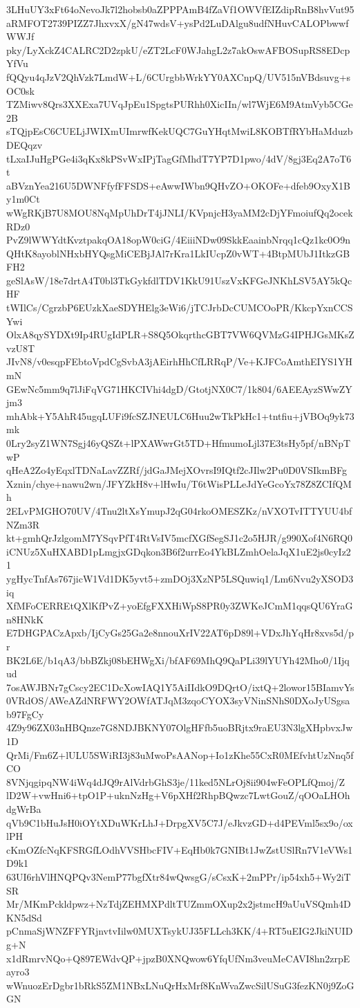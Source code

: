 3LHuUY3xFt64oNevoJk7l2hobsb0aZPPPAmB4fZaVf1OWVfEIZdipRnB8hvVut95
aRMFOT2739PIZZ7JhxvxX/gN47wdsV+ysPd2LuDAlgu8udfNHuvCALOPbwwfWWJf
pky/LyXckZ4CALRC2D2zpkU/eZT2LcF0WJahgL2z7akOswAFBOSupRS8EDcpYfVu
fQQyu4qJzV2QhVzk7LmdW+L/6CUrgbbWrkYY0AXCnpQ/UV515nVBdsuvg+sOC0sk
TZMiwv8Qrs3XXExa7UVqJpEu1SpgtsPURhh0XicIIn/wl7WjE6M9AtmVyb5CGe2B
sTQjpEsC6CUELjJWIXmUImrwfKekUQC7GuYHqtMwiL8KOBTfRYbHaMduzbDEQqzv
tLxaIJuHgPGe4i3qKx8kPSvWxIPjTagGfMhdT7YP7D1pwo/4dV/8gj3Eq2A7oT6t
aBVznYea216U5DWNFfyfFFSDS+eAwwIWbn9QHvZO+OKOFe+dfeb9OxyX1By1m0Ct
wWgRKjB7U8MOU8NqMpUhDrT4jJNLI/KVpnjcH3yaMM2cDjYFmoiufQq2ocekRDz0
PvZ9lWWYdtKvztpakqOA18opW0ciG/4EiiiNDw09SkkEaainbNrqq1cQz1kc0O9n
QHtK8ayoblNHxbHYQsgMiCEBjJAl7rKra1LkIUcpZ0vWT+4BtpMUbJ1ItkzGBFH2
geSlAsW/18e7drtA4T0bl3TkGykfdlTDV1KkU91UszVxKFGeJNKhLSV5AY5kQcHF
tWIlCs/CgrzbP6EUzkXaeSDYHElg3eWi6/jTCJrbDcCUMCOoPR/KkcpYxnCCSYwi
OlxA8qySYDXt9Ip4RUgIdPLR+S8Q5OkqrthcGBT7VW6QVMzG4IPHJGsMKsZvzU8T
JIvN8/v0esqpFEbtoVpdCgSvbA3jAEirhHhCfLRRqP/Ve+KJFCoAmthEIYS1YHmN
GEwNc5mm9q7lJiFqVG71HKCIVhi4dgD/GtotjNX0C7/1k804/6AEEAyzSWwZYjm3
mhAbk+Y5AhR45ugqLUFi9fcSZJNEULC6Huu2wTkPkHc1+tntfiu+jVBOq9yk73mk
0Lry2syZ1WN7Sgj46yQSZt+lPXAWwrGt5TD+HfmumoLjl37E3tsHy5pf/nBNpTwP
qHeA2Zo4yEqxlTDNaLavZZRf/jdGaJMejXOvrsI9IQtf2cJIlw2Pu0D0VSIkmBFg
Xznin/chye+nawu2wn/JFYZkH8v+lHwIu/T6tWisPLLeJdYeGcoYx78Z8ZCIfQMh
2ELvPMGHO70UV/4Tnu2ltXsYmupJ2qG04rkoOMESZKz/nVXOTvITTYUU4bfNZm3R
kt+gmhQrJzlgomM7YSqvPfT4RtVsIV5mcfXGfSegSJ1c2o5HJR/g990Xof4N6RQ0
iCNUz5XuHXABD1pLmgjxGDqkon3B6f2urrEo4YkBLZmhOelaJqX1uE2js0cyIz21
ygHycTnfAs767jicW1Vd1DK5yvt5+zmDOj3XzNP5LSQuwiq1/Lm6Nvu2yXSOD3iq
XfMFoCERREtQXlKfPvZ+yoEfgFXXHiWpS8PR0y3ZWKeJCmM1qqsQU6YraGn8HNkK
E7DHGPACzApxb/IjCyGs25Ga2e8nnouXrIV22AT6pD89l+VDxJhYqHr8xvs5d/pr
BK2L6E/b1qA3/bbBZkj08bEHWgXi/bfAF69MhQ9QaPLi39lYUYh42Mho0/1Ijqud
7osAWJBNr7gCscy2EC1DcXowIAQ1Y5AiIIdkO9DQrtO/ixtQ+2lowor15BIamvYs
0VRdOS/AWeAZdNRFWY2OWfATJqM3zqoCYOX3syVNinSNhS0DXoJyUSgsab97FgCy
4Z9y96ZX03nHBQnze7G8NDJBKNY07OlgHFfb5uoBRjtx9raEU3N3lgXHpbvxJw1D
QrMi/Fm6Z+lULU5SWiRI3j83uMwoPsAANop+Io1zKhe55CxR0MEfvhtUzNnq5fCO
8VNjqgipqNW4iWq4dJQ9rAlVdrbGhS3je/11ked5NLrOj8ii904wFeOPLfQmoj/Z
lD2W+vwHni6+tpO1P+uknNzHg+V6pXHf2RhpBQwzc7LwtGouZ/qOOaLHOhdgWrBa
qVb9C1bHuJsH0iOYtXDuWKrLhJ+DrpgXV5C7J/eJkvzGD+d4PEVml5sx9o/oxlPH
cKmOZfcNqKFSRGfLOdhVVSHbcFIV+EqHb0k7GNIBt1JwZstUSlRn7V1eVWs1D9k1
63UI6rhVlHNQPQv3NemP77bgfXtr84wQwsgG/sCsxK+2mPPr/ip54xh5+Wy2iTSR
Mr/MKmPckldpwz+NzTdjZEHMXPdltTUZmmOXup2x2jstmcH9aUuVSQmh4DKN5dSd
pCnmaSjWNZFFYRjnvtvIilw0MUXTsykUJ35FLLch3KK/4+RT5uEIG2JkiNUIDg+N
x1dRmrvNQo+Q897EWdvQP+jpzB0XNQwow6YfqUfNm3veuMeCAVI8hn2zrpEayro3
wWnuozErDgbr1bRkS5ZM1NBxLNuQrHxMrf8KnWvaZwcSilUSuG3fezKN0j9ZoGGN
